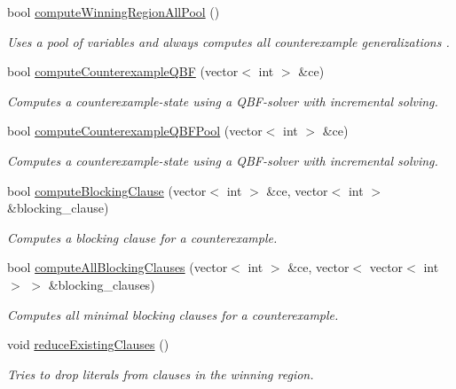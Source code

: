 \begin{DoxyCompactItemize}
bool \hyperlink{classLearnSynthQBFInc_a0e2b88077ae43be99392420608c0305d}{compute\-Winning\-Region\-All\-Pool} ()
\begin{DoxyCompactList}\small\item\em Uses a pool of variables and always computes all counterexample generalizations . \end{DoxyCompactList}\item 
bool \hyperlink{classLearnSynthQBFInc_ac30a0ff65a78a651d7760c4802485355}{compute\-Counterexample\-Q\-B\-F} (vector$<$ int $>$ \&ce)
\begin{DoxyCompactList}\small\item\em Computes a counterexample-\/state using a Q\-B\-F-\/solver with incremental solving. \end{DoxyCompactList}\item 
bool \hyperlink{classLearnSynthQBFInc_aae6b6352969975d113b88ff706e3b334}{compute\-Counterexample\-Q\-B\-F\-Pool} (vector$<$ int $>$ \&ce)
\begin{DoxyCompactList}\small\item\em Computes a counterexample-\/state using a Q\-B\-F-\/solver with incremental solving. \end{DoxyCompactList}\item 
bool \hyperlink{classLearnSynthQBFInc_a52cfd07ff4d94cb9f42eed732ca166dd}{compute\-Blocking\-Clause} (vector$<$ int $>$ \&ce, vector$<$ int $>$ \&blocking\-\_\-clause)
\begin{DoxyCompactList}\small\item\em Computes a blocking clause for a counterexample. \end{DoxyCompactList}\item 
bool \hyperlink{classLearnSynthQBFInc_a979ac9b4cb4d6a8017da2a5e2ba97c82}{compute\-All\-Blocking\-Clauses} (vector$<$ int $>$ \&ce, vector$<$ vector$<$ int $>$ $>$ \&blocking\-\_\-clauses)
\begin{DoxyCompactList}\small\item\em Computes all minimal blocking clauses for a counterexample. \end{DoxyCompactList}\item 
void \hyperlink{classLearnSynthQBFInc_a492a35b7aa57af25fe47b0693f4ec14c}{reduce\-Existing\-Clauses} ()
\begin{DoxyCompactList}\small\item\em Tries to drop literals from clauses in the winning region. \end{DoxyCompactList}\item 

\end{DoxyCompactItemize}
